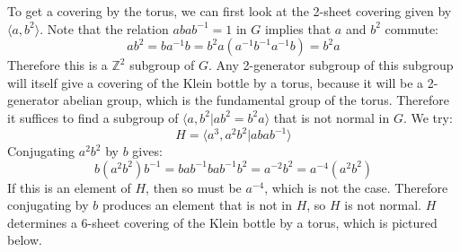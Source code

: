 \documentclass[12 pt]{article}
\newcommand{\Z}{\mathbb{Z}}
\begin{document}
To get a covering by the torus, we can first look at the 2-sheet covering given by $\langle a, b^2 \rangle$.
Note that the relation $abab^{-1} = 1$ in $G$ implies that $a$ and $b^2$ commute:
\[           ab^2 = ba^{-1}b = b^{2}a (a^{-1}b^{-1}a^{-1}b) = b^2a          \]
Therefore this is a $\Z^2$ subgroup of $G$. Any 2-generator subgroup of this subgroup will itself give a
covering of the Klein bottle by a torus, because it will be a 2-generator abelian group, which is the 
fundamental group of the torus. Therefore it suffices to find a subgroup of $\langle a,b^2|ab^2 = b^2a
\rangle$ that is not normal in $G$. We try:
\[   H =   \langle a^3, a^2b^2 | abab^{-1} \rangle     \]
Conjugating $a^2b^2$ by $b$ gives:
\[        b(a^2b^2)b^{-1} = bab^{-1}bab^{-1}b^2 = a^{-2}b^2 = a^{-4} (a^2b^2)     \]
If this is an element of $H$, then so must be $a^{-4}$, which is not the case. Therefore conjugating by
$b$ produces an element that is not in $H$, so $H$ is not normal. $H$ determines a 6-sheet covering
of the Klein bottle by a torus, which is pictured below.
\\
\\
\\
\\
\\
\\
\\
\\
\\
\end{document}
